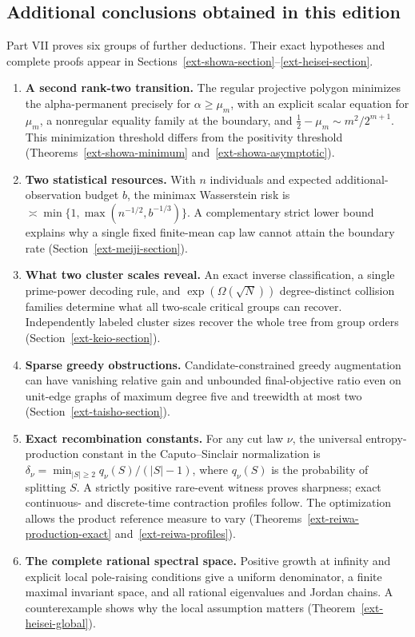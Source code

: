 \documentclass[11pt,a4paper]{article}
\theoremstyle{definition}\newtheorem{definition}[theorem]{Definition}
\theoremstyle{remark}\newtheorem{remark}[theorem]{Remark}
\numberwithin{equation}{section}
\begin{document}
\subsection*{Additional conclusions obtained in this edition}
Part VII proves six groups of further deductions. Their exact hypotheses and complete proofs appear in Sections~\ref{ext-showa-section}--\ref{ext-heisei-section}.
\begin{enumerate}[leftmargin=*]
\item \textbf{A second rank-two transition.} The regular projective polygon minimizes the alpha-permanent precisely for $\alpha\ge\mu_m$, with an explicit scalar equation for $\mu_m$, a nonregular equality family at the boundary, and $\tfrac12-\mu_m\sim m^2/2^{m+1}$. This minimization threshold differs from the positivity threshold (Theorems~\ref{ext-showa-minimum} and~\ref{ext-showa-asymptotic}).
\item \textbf{Two statistical resources.} With $n$ individuals and expected additional-observation budget $b$, the minimax Wasserstein risk is $\asymp\min\{1,\max(n^{-1/2},b^{-1/3})\}$. A complementary strict lower bound explains why a single fixed finite-mean cap law cannot attain the boundary rate (Section~\ref{ext-meiji-section}).
\item \textbf{What two cluster scales reveal.} An exact inverse classification, a single prime-power decoding rule, and $\exp(\Omega(\sqrt N))$ degree-distinct collision families determine what all two-scale critical groups can recover. Independently labeled cluster sizes recover the whole tree from group orders (Section~\ref{ext-keio-section}).
\item \textbf{Sparse greedy obstructions.} Candidate-constrained greedy augmentation can have vanishing relative gain and unbounded final-objective ratio even on unit-edge graphs of maximum degree five and treewidth at most two (Section~\ref{ext-taisho-section}).
\item \textbf{Exact recombination constants.} For any cut law $\nu$, the universal entropy-production constant in the Caputo--Sinclair normalization is $\delta_\nu=\min_{|S|\ge2}q_\nu(S)/(|S|-1)$, where $q_\nu(S)$ is the probability of splitting $S$. A strictly positive rare-event witness proves sharpness; exact continuous- and discrete-time contraction profiles follow. The optimization allows the product reference measure to vary (Theorems~\ref{ext-reiwa-production-exact} and~\ref{ext-reiwa-profiles}).
\item \textbf{The complete rational spectral space.} Positive growth at infinity and explicit local pole-raising conditions give a uniform denominator, a finite maximal invariant space, and all rational eigenvalues and Jordan chains. A counterexample shows why the local assumption matters (Theorem~\ref{ext-heisei-global}).
\end{enumerate}
\end{document}
